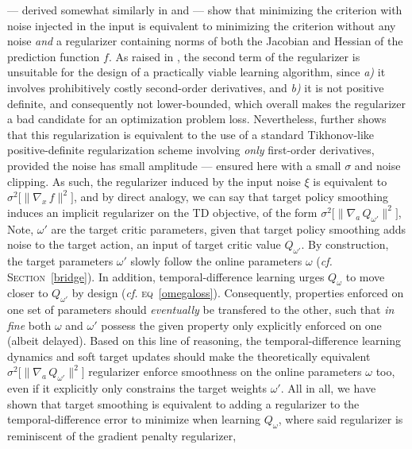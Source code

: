 --- derived somewhat similarly in \cite{Webb1994-ar} and \cite{Bishop1995-ea} ---
show that minimizing the criterion with
noise injected in the input is equivalent to minimizing the criterion
without any noise \emph{and} a regularizer containing norms of both
the Jacobian and Hessian of the prediction function $f$.
As raised in \cite{Bishop1995-ea},
the second term of the regularizer is unsuitable for the design of
a practically viable learning algorithm, since
\textit{a)} it involves prohibitively costly second-order derivatives,
and \textit{b)} it is not positive definite, and consequently not lower-bounded,
which overall makes the regularizer a bad candidate for an optimization problem loss.
Nevertheless, \cite{Bishop1995-ea} further shows that this regularization is equivalent
to the use of a standard Tikhonov-like positive-definite regularization scheme
involving \emph{only} first-order derivatives,
provided the noise has small amplitude --- ensured here with a small $\sigma$
and noise clipping.
As such, the regularizer induced by the input noise $\xi$ is equivalent to
$\sigma^2 \big [ \lVert \nabla_x \, f \rVert^2 \big ]$,
and by direct analogy, we can say that
target policy smoothing induces an implicit regularizer on the TD objective,
of the form $\sigma^2 \big [ \lVert \nabla_a \, Q_{\omega'} \rVert^2 \big ]$,
Note, $\omega'$ are the target critic parameters, given that
target policy smoothing adds noise to the target action,
an input of target critic value $Q_{\omega'}$.
By construction,
the target parameters $\omega'$ slowly follow the online parameters $\omega$
(\textit{cf.} \textsc{Section}~\ref{bridge}).
In addition, temporal-difference learning urges $Q_\omega$ to move closer to
$Q_{\omega'}$ by design
(\textit{cf.} \textsc{eq}~\ref{omegaloss}).
Consequently, properties enforced on one set of parameters
should \emph{eventually} be transfered to the other,
such that \textit{in fine} both $\omega$ and $\omega'$ possess the given property
only explicitly enforced on one (albeit delayed).
Based on this line of reasoning,
the temporal-difference learning dynamics and soft target updates should
make the theoretically equivalent $\sigma^2 \big [ \lVert \nabla_a \, Q_{\omega'} \rVert^2 \big ]$
regularizer enforce smoothness on the online parameters $\omega$ too,
even if it explicitly only constrains the target weights $\omega'$.
All in all, we have shown that target smoothing is equivalent to
adding a regularizer to the temporal-difference error to minimize when learning $Q_\omega$,
where said regularizer is reminiscent of the gradient penalty regularizer,
